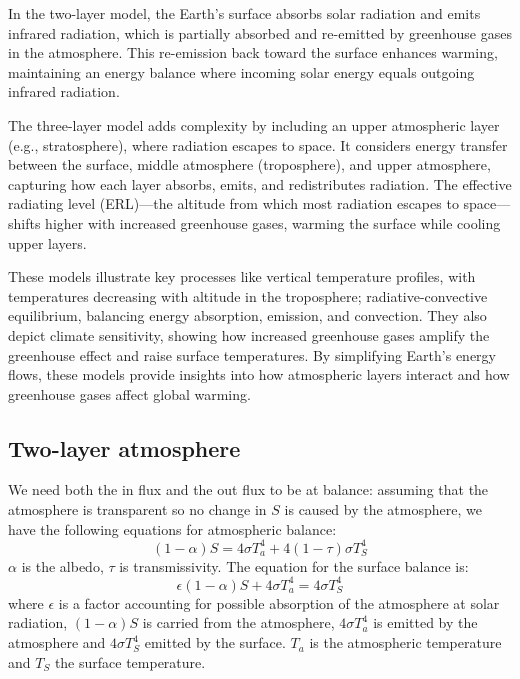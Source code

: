 In the two-layer model, the Earth's surface absorbs solar radiation and emits infrared radiation, which is partially absorbed and re-emitted by greenhouse gases in the atmosphere. This re-emission back toward the surface enhances warming, maintaining an energy balance where incoming solar energy equals outgoing infrared radiation.

The three-layer model adds complexity by including an upper atmospheric layer (e.g., stratosphere), where radiation escapes to space. It considers energy transfer between the surface, middle atmosphere (troposphere), and upper atmosphere, capturing how each layer absorbs, emits, and redistributes radiation. The effective radiating level (ERL)—the altitude from which most radiation escapes to space—shifts higher with increased greenhouse gases, warming the surface while cooling upper layers.


These models illustrate key processes like vertical temperature profiles, with temperatures decreasing with altitude in the troposphere; radiative-convective equilibrium, balancing energy absorption, emission, and convection. They also depict climate sensitivity, showing how increased greenhouse gases amplify the greenhouse effect and raise surface temperatures.
By simplifying Earth's energy flows, these models provide insights into how atmospheric layers interact and how greenhouse gases affect global warming.
\subsection{Two-layer atmosphere}
We need both the in flux and the out flux to be at balance: assuming that the atmosphere is transparent so no change in $S$ is caused by the atmosphere, we have the following equations for atmospheric balance:
\begin{equation}\label{eq.two layer}
    (1-\alpha)S=4\sigma T^4_{a}+4(1-\tau)\sigma T_S^4
\end{equation}
$\alpha$ is the albedo, $\tau$ is transmissivity. The equation for the surface balance is:
\begin{equation}\label{eq.surface balance}
    \epsilon (1-\alpha)S+4\sigma T_a^4=4\sigma T_S^4
\end{equation}
where $\epsilon$ is a factor accounting for possible absorption of the atmosphere at solar radiation, $(1-\alpha)S$  is carried from the atmosphere, $4\sigma T_a^4$ is emitted by the atmosphere and $4\sigma T_S^4$ emitted by the surface.
$T_a$ is the atmospheric temperature and $T_S$ the surface temperature. 


